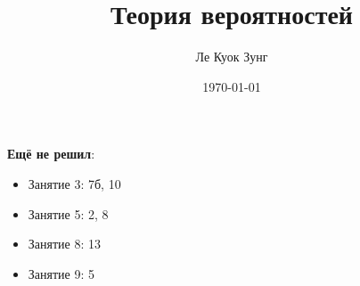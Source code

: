 \documentclass{article}
\title{Теория вероятностей}
\author{Ле Куок Зунг}
\date{\today}
\theoremstyle{definition}
\begin{document}
	\maketitle
	
	\newpage
	
	\newpage
	
	\newpage
	
	\newpage
	
	\newpage
	
	\newpage
	
	\newpage
	
	\newpage
	
	\newpage
	
	\newpage
	
	\newpage
	
	\newpage
	\textbf{Ещё не решил}:
	\begin{itemize}
		\item Занятие 3: 7б, 10
		\item Занятие 5: 2, 8
		\item Занятие 8: 13
		\item Занятие 9: 5
	\end{itemize}
	\newpage
	
\end{document}
